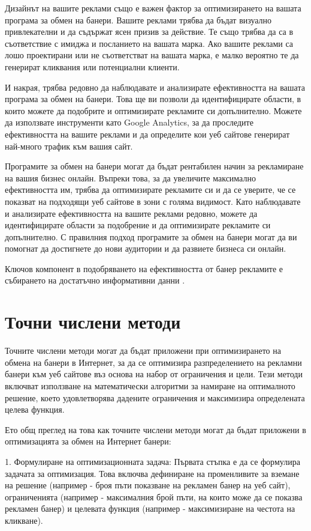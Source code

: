 Дизайнът на вашите реклами също е важен фактор за оптимизирането на вашата програма за обмен на банери. Вашите реклами трябва да бъдат визуално привлекателни и да съдържат ясен призив за действие. Те също трябва да са в съответствие с имиджа и посланието на вашата марка. Ако вашите реклами са лошо проектирани или не съответстват на вашата марка, е малко вероятно те да генерират кликвания или потенциални клиенти.

И накрая, трябва редовно да наблюдавате и анализирате ефективността на вашата програма за обмен на банери. Това ще ви позволи да идентифицирате области, в които можете да подобрите и оптимизирате рекламите си допълнително. Можете да използвате инструменти като Google Analytics, за да проследите ефективността на вашите реклами и да определите кои уеб сайтове генерират най-много трафик към вашия сайт.

Програмите за обмен на банери могат да бъдат рентабилен начин за рекламиране на вашия бизнес онлайн. Въпреки това, за да увеличите максимално ефективността им, трябва да оптимизирате рекламите си и да се уверите, че се показват на подходящи уеб сайтове в зони с голяма видимост. Като наблюдавате и анализирате ефективността на вашите реклами редовно, можете да идентифицирате области за подобрение и да оптимизирате рекламите си допълнително. С правилния подход програмите за обмен на банери могат да ви помогнат да достигнете до нови аудитории и да развиете бизнеса си онлайн.

Ключов компонент в подобряването на ефективността от банер рекламите е събирането на достатъчно информативни данни \cite{LANGHEINRICH19991259}.

\section{Точни числени методи}

Точните числени методи могат да бъдат приложени при оптимизирането на обмена на банери в Интернет, за да се оптимизира разпределението на рекламни банери към уеб сайтове въз основа на набор от ограничения и цели. Тези методи включват използване на математически алгоритми за намиране на оптималното решение, което удовлетворява дадените ограничения и максимизира определената целева функция.

Ето общ преглед на това как точните числени методи могат да бъдат приложени в оптимизацията за обмен на Интернет банери:

1. Формулиране на оптимизационната задача: Първата стъпка е да се формулира задачата за оптимизация. Това включва дефиниране на променливите за вземане на решение (например - броя пъти показване на рекламен банер на уеб сайт), ограниченията (например - максималния брой пъти, на които може да се показва рекламен банер) и целевата функция (например - максимизиране на честота на кликване).

